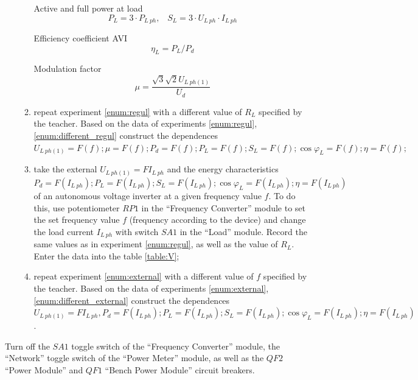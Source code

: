 \documentclass[a4paper,14pt]{article}
\begin{document}
\begin{enumerate}
\begin{enumerate}
Active and full power at load
\begin{equation}
P_L = 3\cdot P_{L\:ph},\;\;\; S_L = 3\cdot U_{L\:ph}\cdot I_{L\:ph}
\end{equation}
 

Efficiency coefficient AVI
\begin{equation}
\eta_L = P_L/P_d
\end{equation}

Modulation factor
\begin{equation}
\mu = \frac{\sqrt{3}\sqrt{2}U_{L\:ph(1)}}{U_d}
\end{equation}


\item \label{enum:different_regul} repeat experiment \ref{enum:regul} with a different value of $R_L$ specified by the teacher. 
Based on the data of experiments \ref{enum:regul}, \ref{enum:different_regul} construct the dependences $U_{L\:ph(1)} = F(f); \mu = F(f); P_d = F(f); P_L = F(f); S_L = F(f); \cos\varphi_L = F(f); \eta = F(f);$



\item \label{enum:external} take the external $U_{L\:ph(1)} = F{I_{L\:ph}}$ and the energy characteristics $P_d = F(I_{L\:ph}); P_L = F(I_{L\:ph}); S_L = F(I_{L\:ph}); \cos\varphi_L = F(I_{L\:ph}); \eta = F(I_{L\:ph})$  of an autonomous voltage inverter at a given frequency value $f$. 
To do this, use potentiometer $RP1$ in the “Frequency Converter” module to set the set frequency value $f$ (frequency according to the device) and change the load current $I_{L\:ph}$ with switch $SA1$ in the “Load” module. 
Record the same values as in experiment \ref{enum:regul}, as well as the value of $R_L$.
Enter the data into the table \ref{table:V};
\item \label{enum:different_external}repeat experiment \ref{enum:external} with a different value of $f$ specified by the teacher. Based on the data of experiments \ref{enum:external}, \ref{enum:different_external} 
construct the dependences $U_{L\:ph(1)} = F{I_{L\:ph}}, P_d = F(I_{L\:ph}); P_L = F(I_{L\:ph}); S_L = F(I_{L\:ph}); \cos\varphi_L = F(I_{L\:ph}); \eta = F(I_{L\:ph})$.

\end{enumerate}
\end{enumerate}

Turn off the $SA1$ toggle switch of the “Frequency Converter” module, the “Network” toggle switch of the “Power Meter” module, as well as the $QF2$ “Power Module” and $QF1$ “Bench Power Module” circuit breakers.
\end{document}
